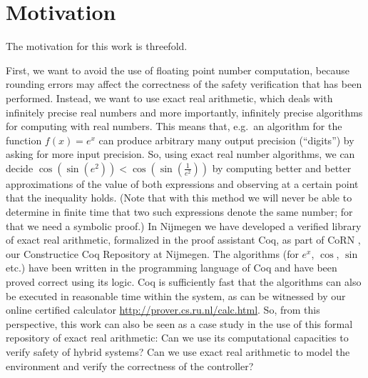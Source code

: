 \documentclass[runningheads]{llncs}
\begin{document}
\section{Motivation}
The motivation for this work is threefold. 

First, we want to avoid the use of floating point number computation,
because rounding errors may affect the correctness of the safety
verification that has been performed. Instead, we want to use exact
real arithmetic, which deals with infinitely precise real numbers and
more importantly, infinitely precise algorithms for computing with
real numbers. This means that, e.g.\ an algorithm for the function
$f(x) = e^x$ can produce arbitrary many output precision (``digits'')
by asking for more input precision. So, using exact real number
algorithms, we can decide $\cos(\sin(e^2))<\cos(\sin(\frac{1}{e^2}))$
by computing better and better approximations of the value of both
expressions and observing at a certain point that the inequality
holds. (Note that with this method we will never be able to determine
in finite time that two such expressions denote the same number; for
that we need a symbolic proof.) In Nijmegen we have developed a
verified library of exact real arithmetic, formalized in the proof
assistant Coq, as part of CoRN \cite{corn,oconnor}, our Constructice
Coq Repository at Nijmegen. The algorithms (for $e^x$, $\cos$, $\sin$
etc.) have been written in the programming language of Coq and have
been proved correct using its logic. Coq is sufficiently fast that the
algorithms can also be executed in reasonable time within the system,
as can be witnessed by our online certified calculator
\url{http://prover.cs.ru.nl/calc.html}. So, from this perspective,
this work can also be seen as a case study in the use of this formal
repository of exact real arithmetic: Can we use its computational
capacities to verify safety of hybrid systems? Can we use exact real
arithmetic to model the environment and verify the correctness of the
controller?
\end{document}
